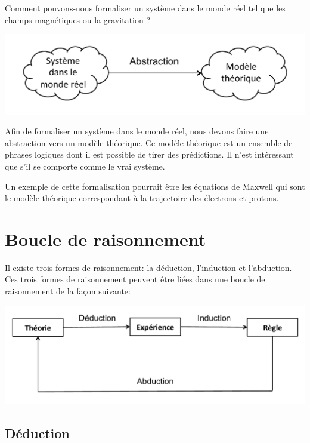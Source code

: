 Comment pouvons-nous formaliser un système dans le monde réel tel que les champs magnétiques ou la gravitation ?

\begin{center}
\includegraphics[scale=0.65]{images/Abstraction.pdf}
\end{center}

Afin de formaliser un système dans le monde réel, nous devons faire une abstraction vers un modèle théorique. Ce modèle théorique est un ensemble de phrases logiques dont il est possible de tirer des prédictions. Il n'est intéressant que s'il se comporte comme le vrai système.

Un exemple de cette formalisation pourrait être les équations de Maxwell qui sont le modèle théorique correspondant à la trajectoire des électrons et protons.

\section{Boucle de raisonnement}

Il existe trois formes de raisonnement: la déduction, l'induction et l'abduction. Ces trois formes de raisonnement peuvent être liées dans une boucle de raisonnement de la façon suivante:

\begin{center}
\includegraphics[scale=0.50]{images/BoucleRaisonnement1.pdf}
\end{center}

\subsection{Déduction}

